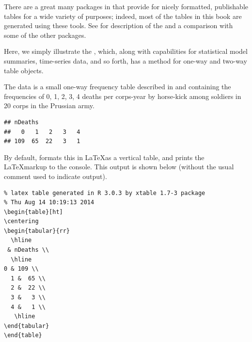 \documentclass[11pt]{book}
\renewenvironment{knitrout}{\small\renewcommand{\baselinestretch}{.85}}{} %
\begin{document}
There are a great many packages in \R that provide for nicely formatted,
publishable tables for a wide variety of purposes; indeed, most of the tables
in this book are generated using these tools.
See \citet{Leifeld:2013:JSS} for description of the 
and a comparison with some of the other packages.

Here, we simply illustrate the , which, along with
capabilities for statistical model summaries, time-series data, and
so forth, has a  method for one-way and two-way
table objects.

The  data is a small one-way frequency table 
described in  and containing the frequencies
of 0, 1, 2, 3, 4 deaths per corps-year by horse-kick among soldiers in 20 corps in
the Prussian army.
\begin{knitrout}
\color{fgcolor}\begin{kframe}
\begin{alltt}
 \hlstd{=}\hlstd{)}
\end{alltt}
\begin{verbatim}
## nDeaths
##   0   1   2   3   4 
## 109  65  22   3   1
\end{verbatim}
\end{kframe}
\end{knitrout}
By default,  formats this in \LaTeX as a vertical table,
and prints the \LaTeX markup to the \R console.  This output is shown
below (without the usual \code{\#\#} comment used to indicate \R output).
\begin{knitrout}
\color{fgcolor}\begin{kframe}
\begin{alltt}
\end{alltt}
\begin{verbatim}
% latex table generated in R 3.0.3 by xtable 1.7-3 package
% Thu Aug 14 10:19:13 2014
\begin{table}[ht]
\centering
\begin{tabular}{rr}
  \hline
 & nDeaths \\ 
  \hline
0 & 109 \\ 
  1 &  65 \\ 
  2 &  22 \\ 
  3 &   3 \\ 
  4 &   1 \\ 
   \hline
\end{tabular}
\end{table}
\end{verbatim}
\end{kframe}
\end{knitrout}
\end{document}
